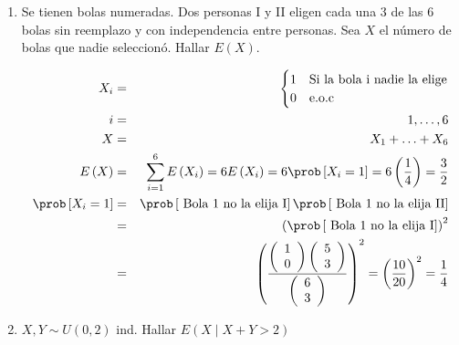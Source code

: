 \begin{enumerate}
\item Se tienen bolas numeradas. Dos personas I y II eligen cada una 3 de las 6 bolas sin reemplazo y con independencia entre personas. Sea $X$ el n\' umero de bolas que nadie seleccion\' o. Hallar $E \left(X \right)$.

\begin{eqnarray*}
X_{i} &=&\begin{cases}
1 & \textrm{Si la bola i nadie la elige}  \\
0 & \textrm{e.o.c}
\end{cases}\\
i&=&1,\ldots ,6\\
X&=& X_{1}+\ldots+ X_{6}\\
E\left(X \right) &=& \sum_{i=1}^{6} E\left(X_{i} \right)= 6 E\left(X_{i} \right) = 6 \prob \left[X_{i} = 1 \right] = 6 \left(\frac{1}{4} \right) = \frac{3}{2}\\
\prob \left[X_{i} = 1 \right]  &=& \prob \left[ \textrm{ Bola 1 no la elija I} \right] \prob \left[ \textrm{ Bola 1 no la elija II} \right]\\
&=& \left( \prob \left[ \textrm{ Bola 1 no la elija I} \right]\right)^{2}\\
&=& \left(\dfrac{\left(\begin{array}{c} 
1\\
0
\end{array} \right)\left(\begin{array}{c} 
5\\
3
\end{array} \right) }{ \left(\begin{array}{c} 
6\\
3
\end{array} \right)} \right)^{2}= \left( \frac{10}{20}\right)^{2} = \frac{1}{4}
\end{eqnarray*}

\item $X,Y \sim U \left(0,2 \right)$ ind. Hallar $E \left(X \mid X+Y > 2 \right) $


\end{enumerate}
